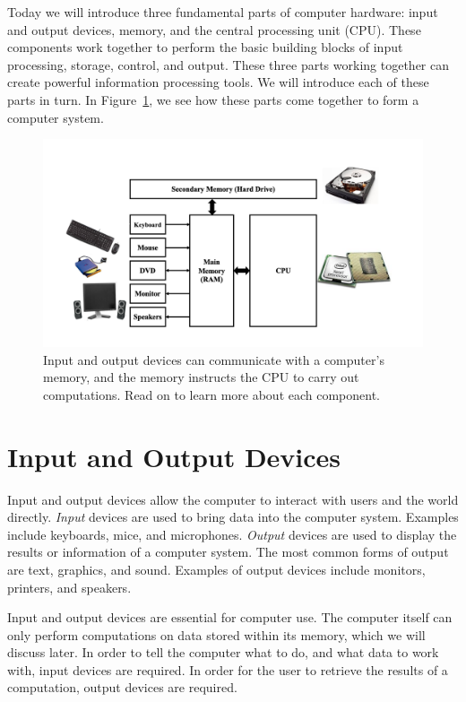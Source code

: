 Today we will introduce three fundamental parts of computer hardware: input and output devices, memory, and the central processing unit (CPU). These components work together to perform the basic building blocks of input processing, storage, control, and output. These three parts working together can create powerful information processing tools. We will introduce each of these parts in turn. In Figure~\ref{fig:hardware:overview}, we see how these parts come together to form a computer system.

\begin{figure}
	\centering
	\includegraphics[width=\textwidth]{images/cs_intro_hardware_overview.png}
	\caption{Input and output devices can communicate with a computer's memory, and the memory instructs the CPU to carry out computations. Read on to learn more about each component.
                 }
	\label{fig:hardware:overview}
\end{figure}

\section{Input and Output Devices}

Input and output  devices allow the computer to interact with users and the world directly.  \emph{Input} devices are used to bring data into the computer system. Examples include keyboards, mice, and microphones. \emph{Output} devices are used to display the results or information of a computer system. The most common forms of output are text, graphics, and sound. Examples of output devices include monitors, printers, and speakers. 

Input and output devices are essential for computer use. The computer itself can only perform computations on data stored within its memory, which we will discuss later. In order to tell the computer what to do, and what data to work with, input devices are required. In order for the user to retrieve the results of a computation, output devices are required.

